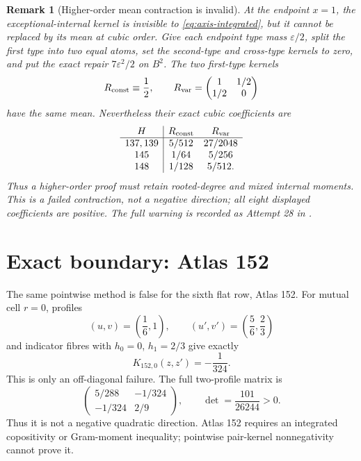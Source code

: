 \documentclass[11pt]{article}
\newtheorem{remark}[theorem]{Remark}
\begin{document}
\begin{remark}[Higher-order mean contraction is invalid]
At the endpoint $x=1$, the exceptional-internal kernel is invisible to
\eqref{eq:axis-integrated}, but it cannot be replaced by its mean at cubic
order.  Give each endpoint type mass $\varepsilon/2$, split the first type
into two equal atoms, set the second-type and cross-type kernels to zero, and
put the exact repair $7\varepsilon^2/2$ on $B^2$.  The two first-type kernels
\[
R_{\rm const}\equiv\frac12,\qquad
 R_{\rm var}=\begin{pmatrix}1&1/2\\1/2&0\end{pmatrix}
\]
have the same mean.  Nevertheless their exact cubic coefficients are
\[
\begin{array}{c|cc}
H&R_{\rm const}&R_{\rm var}\\ \hline
137,139&5/512&27/2048\\
145&1/64&5/256\\
148&1/128&5/512.
\end{array}
\]
Thus a higher-order proof must retain rooted-degree and mixed internal
moments.  This is a failed contraction, not a negative direction; all eight
displayed coefficients are positive.  The full warning is recorded as
Attempt 28 in .
\end{remark}

\section{Exact boundary: Atlas 152}

The same pointwise method is false for the sixth flat row, Atlas 152.
For mutual cell $r=0$, profiles
\[
 (u,v)=\left(\frac16,1\right),\qquad
 (u',v')=\left(\frac56,\frac23\right)
\]
and indicator fibres with $h_0=0$, $h_1=2/3$ give exactly
\[
 K_{152,0}(z,z')=-\frac1{324}.
\]
This is only an off-diagonal failure.  The full two-profile matrix is
\[
 \begin{pmatrix}5/288&-1/324\\-1/324&2/9\end{pmatrix},
 \qquad \det=\frac{101}{26244}>0.
\]
Thus it is not a negative quadratic direction.  Atlas 152 requires an
integrated copositivity or Gram-moment inequality; pointwise pair-kernel
nonnegativity cannot prove it.
\end{document}
